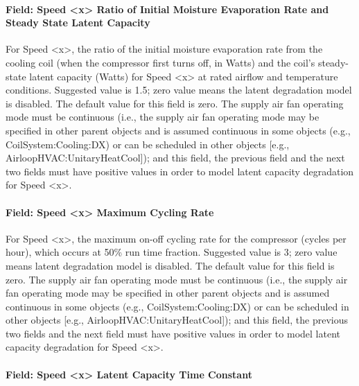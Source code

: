 \paragraph{Field: Speed \textless{}x\textgreater{} Ratio of Initial Moisture Evaporation Rate and Steady State Latent Capacity}\label{field-speed-x-ratio-of-initial-moisture-evaporation-rate-and-steady-state-latent-capacity}

For Speed \textless{}x\textgreater{}, the ratio of the initial moisture evaporation rate from the cooling coil (when the compressor first turns off, in Watts) and the coil's steady-state latent capacity (Watts) for Speed \textless{}x\textgreater{} at rated airflow and temperature conditions. Suggested value is 1.5; zero value means the latent degradation model is disabled. The default value for this field is zero. The supply air fan operating mode must be continuous (i.e., the supply air fan operating mode may be specified in other parent objects and is assumed continuous in some objects (e.g., CoilSystem:Cooling:DX) or can be scheduled in other objects {[}e.g., AirloopHVAC:UnitaryHeatCool{]}); and this field, the previous field and the next two fields must have positive values in order to model latent capacity degradation for Speed \textless{}x\textgreater{}.

\paragraph{Field: Speed \textless{}x\textgreater{} Maximum Cycling Rate}\label{field-speed-x-maximum-cycling-rate}

For Speed \textless{}x\textgreater{}, the maximum on-off cycling rate for the compressor (cycles per hour), which occurs at 50\% run time fraction. Suggested value is 3; zero value means latent degradation model is disabled. The default value for this field is zero. The supply air fan operating mode must be continuous (i.e., the supply air fan operating mode may be specified in other parent objects and is assumed continuous in some objects (e.g., CoilSystem:Cooling:DX) or can be scheduled in other objects {[}e.g., AirloopHVAC:UnitaryHeatCool{]}); and this field, the previous two fields and the next field must have positive values in order to model latent capacity degradation for Speed \textless{}x\textgreater{}.

\paragraph{Field: Speed \textless{}x\textgreater{} Latent Capacity Time Constant}\label{field-speed-x-latent-capacity-time-constant}

